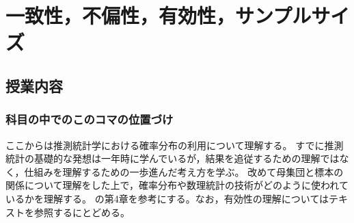 \section{一致性，不偏性，有効性，サンプルサイズ}
\subsection{授業内容}
\subsubsection{科目の中でのこのコマの位置づけ}
ここからは推測統計学における確率分布の利用について理解する。
すでに推測統計の基礎的な発想は一年時に学んでいるが，結果を追従するための理解ではなく，仕組みを理解するための一歩進んだ考え方を学ぶ。
改めて母集団と標本の関係について理解をした上で，確率分布や数理統計の技術がどのように使われているかを理解する。
\textcite{kosugi2023}の第4章を参考にする。なお，有効性の理解についてはテキストを参照するにとどめる。

